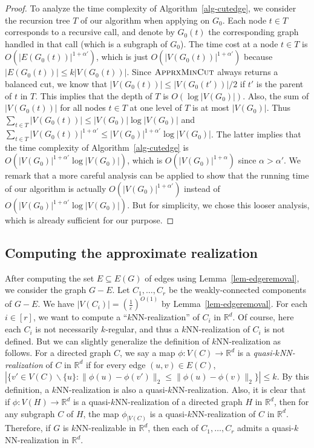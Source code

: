 \begin{proof}
To analyze the time complexity of Algorithm~\ref{alg-cutedge}, we consider the recursion tree $T$ of our algorithm when applying on $G_0$.
Each node $t \in T$ corresponds to a recursive call, and denote by $G_0(t)$ the corresponding graph handled in that call (which is a subgraph of $G_0$).
The time cost at a node $t \in T$ is $O(|E(G_0(t))|^{1+\alpha'})$, which is just $O(|V(G_0(t))|^{1+\alpha'})$ because $|E(G_0(t))| \leq k|V(G_0(t))|$.
Since $\textsc{ApprxMinCut}$ always returns a balanced cut, we know that $|V(G_0(t))| \leq |V(G_0(t'))|/2$ if $t'$ is the parent of $t$ in $T$.
This implies that the depth of $T$ is $O(\log |V(G_0)|)$.
Also, the sum of $|V(G_0(t))|$ for all nodes $t \in T$ at one level of $T$ is at most $|V(G_0)|$.
Thus $\sum_{t \in T} |V(G_0(t))| \leq |V(G_0)| \log |V(G_0)|$ and $\sum_{t \in T} |V(G_0(t))|^{1+\alpha'} \leq |V(G_0)|^{1+\alpha'} \log |V(G_0)|$.
The latter implies that the time complexity of Algorithm~\ref{alg-cutedge} is $O(|V(G_0)|^{1+\alpha'} \log |V(G_0)|)$, which is $O(|V(G_0)|^{1+\alpha})$ since $\alpha > \alpha'$.
We remark that a more careful analysis can be applied to show that the running time of our algorithm is actually $O(|V(G_0)|^{1+\alpha'})$ instead of $O(|V(G_0)|^{1+\alpha'} \log |V(G_0)|)$.
But for simplicity, we chose this looser analysis, which is already sufficient for our purpose.
\end{proof}

\subsection{Computing the approximate realization} \label{sec-component}

After computing the set $E \subseteq E(G)$ of edges using Lemma~\ref{lem-edgeremoval}, we consider the graph $G - E$.
Let $C_1,\dots,C_r$ be the weakly-connected components of $G - E$.
We have $|V(C_i)| = (\frac{1}{\varepsilon})^{O(1)}$ by Lemma~\ref{lem-edgeremoval}.
For each $i \in [r]$, we want to compute a ``$k$NN-realization'' of $C_i$ in $\mathbb{R}^d$.
Of course, here each $C_i$ is not necessarily $k$-regular, and thus a $k$NN-realization of $C_i$ is not defined.
But we can slightly generalize the definition of $k$NN-realization as follows.
For a directed graph $C$, we say a map $\phi: V(C) \rightarrow \mathbb{R}^d$ is a \textit{quasi-$k$NN-realization} of $C$ in $\mathbb{R}^d$ if for every edge $(u,v) \in E(C)$, $|\{v' \in V(C) \backslash \{u\}: \lVert \phi(u) - \phi(v') \rVert_2 \leq \lVert \phi(u) - \phi(v) \rVert_2\}| \leq k$.
By this definition, a $k$NN-realization is also a quasi-$k$NN-realization.
Also, it is clear that if $\phi:V(H) \rightarrow \mathbb{R}^d$ is a quasi-$k$NN-realization of a directed graph $H$ in $\mathbb{R}^d$, then for any subgraph $C$ of $H$, the map $\phi_{|V(C)}$ is a quasi-$k$NN-realization of $C$ in $\mathbb{R}^d$.
Therefore, if $G$ is $k$NN-realizable in $\mathbb{R}^d$, then each of $C_1,\dots,C_r$ admits a quasi-$k$NN-realization in $\mathbb{R}^d$.

